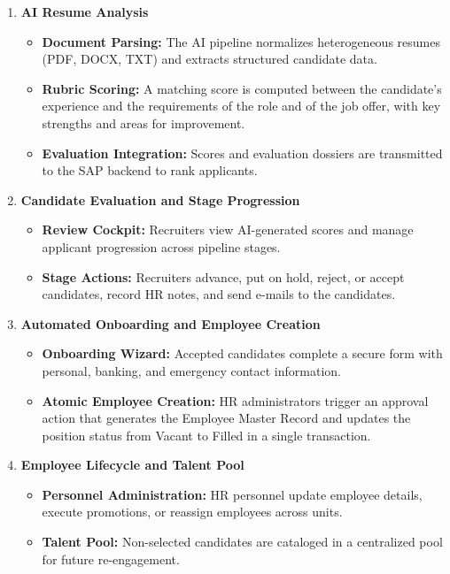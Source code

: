 \begin{enumerate}
    \item \textbf{AI Resume Analysis}
    \begin{itemize}
        \item \textbf{Document Parsing:} The AI pipeline normalizes heterogeneous resumes (PDF, DOCX, TXT) and extracts structured candidate data.
        \item \textbf{Rubric Scoring:} A matching score is computed between the candidate's experience and the requirements of the role and of the job offer, with key strengths and areas for improvement.
        \item \textbf{Evaluation Integration:} Scores and evaluation dossiers are transmitted to the SAP backend to rank applicants.
    \end{itemize}

    \item \textbf{Candidate Evaluation and Stage Progression}
    \begin{itemize}
        \item \textbf{Review Cockpit:} Recruiters view AI-generated scores and manage applicant progression across pipeline stages.
        \item \textbf{Stage Actions:} Recruiters advance, put on hold, reject, or accept candidates, record HR notes, and send e-mails to the candidates.
    \end{itemize}

    \item \textbf{Automated Onboarding and Employee Creation}
    \begin{itemize}
        \item \textbf{Onboarding Wizard:} Accepted candidates complete a secure form with personal, banking, and emergency contact information.
        \item \textbf{Atomic Employee Creation:} HR administrators trigger an approval action that generates the Employee Master Record and updates the position status from Vacant to Filled in a single transaction.
    \end{itemize}

    \item \textbf{Employee Lifecycle and Talent Pool}
    \begin{itemize}
        \item \textbf{Personnel Administration:} HR personnel update employee details, execute promotions, or reassign employees across units.
        \item \textbf{Talent Pool:} Non-selected candidates are cataloged in a centralized pool for future re-engagement.
    \end{itemize}

\end{enumerate}

